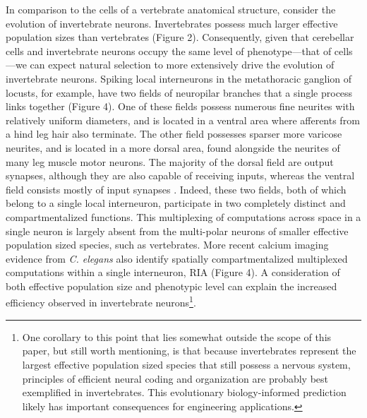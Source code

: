 \documentclass{article}
\begin{document}
In comparison to the cells of a vertebrate anatomical structure, consider the evolution of invertebrate neurons. Invertebrates possess much larger effective population sizes than vertebrates (Figure 2). Consequently, given that cerebellar cells and invertebrate neurons occupy the same level of phenotype---that of cells---we can expect natural selection to more extensively drive the evolution of invertebrate neurons. Spiking local interneurons in the metathoracic ganglion of locusts, for example, have two fields of neuropilar branches that a single process links together (Figure 4). One of these fields possess numerous fine neurites with relatively uniform diameters, and is located in a ventral area where afferents from a hind leg hair also terminate. The other field possesses sparser more varicose neurites, and is located in a more dorsal area, found alongside the neurites of many leg muscle motor neurons. The majority of the dorsal field are output synapses, although they are also capable of receiving inputs, whereas the ventral field consists mostly of input synapses \cite{watson_burrows_1985}. Indeed, these two fields, both of which belong to a single local interneuron, participate in two completely distinct and compartmentalized functions. This multiplexing of computations across space in a single neuron is largely absent from the multi-polar neurons of smaller effective population sized species, such as vertebrates. More recent calcium imaging evidence from \textit{C. elegans} also identify spatially compartmentalized multiplexed computations within a single interneuron, RIA \cite{Hendricks_Ha_Maffey_Zhang_2012} (Figure 4). A consideration of both effective population size and phenotypic level can explain the increased efficiency observed in invertebrate neurons\footnote{One corollary to this point that lies somewhat outside the scope of this paper, but still worth mentioning, is that because invertebrates represent the largest effective population sized species that still possess a nervous system, principles of efficient neural coding and organization are probably best exemplified in invertebrates. This evolutionary biology-informed prediction likely has important consequences for engineering applications.}. 
\end{document}
